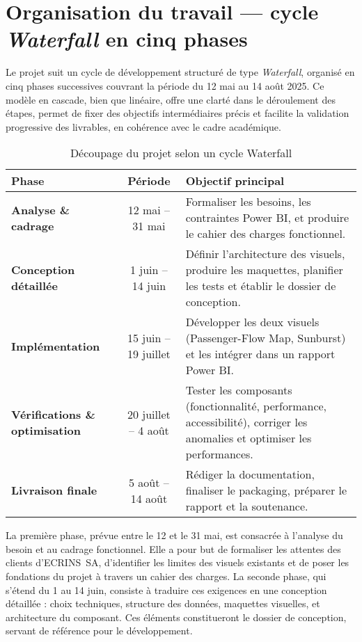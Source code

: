 \section{Organisation du travail — cycle \emph{Waterfall} en cinq phases}
\label{sec:organisation-waterfall}

Le projet suit un cycle de développement structuré de type \emph{Waterfall}, organisé en cinq phases successives couvrant la période du 12 mai au 14 août 2025. Ce modèle en cascade, bien que linéaire, offre une clarté dans le déroulement des étapes, permet de fixer des objectifs intermédiaires précis et facilite la validation progressive des livrables, en cohérence avec le cadre académique.

\begin{table}[H]
  \centering
  \caption{Découpage du projet selon un cycle Waterfall}
  \label{tab:planning-waterfall}
  \begin{tabularx}{\textwidth}{@{}>{\bfseries}l c X@{}}
    \toprule
    Phase & Période & Objectif principal \\
    \midrule
    Analyse \& cadrage & 12 mai – 31 mai & Formaliser les besoins, les contraintes Power BI, et produire le cahier des charges fonctionnel. \\
    Conception détaillée & 1 juin – 14 juin & Définir l’architecture des visuels, produire les maquettes, planifier les tests et établir le dossier de conception. \\
    Implémentation & 15 juin – 19 juillet & Développer les deux visuels (Passenger-Flow Map, Sunburst) et les intégrer dans un rapport Power BI. \\
    Vérifications \& optimisation & 20 juillet – 4 août & Tester les composants (fonctionnalité, performance, accessibilité), corriger les anomalies et optimiser les performances. \\
    Livraison finale & 5 août – 14 août & Rédiger la documentation, finaliser le packaging, préparer le rapport et la soutenance. \\
    \bottomrule
  \end{tabularx}
\end{table}

La première phase, prévue entre le 12 et le 31 mai, est consacrée à l’analyse du besoin et au cadrage fonctionnel. Elle a pour but de formaliser les attentes des clients d’ECRINS~SA, d’identifier les limites des visuels existants et de poser les fondations du projet à travers un cahier des charges. La seconde phase, qui s’étend du 1 au 14 juin, consiste à traduire ces exigences en une conception détaillée : choix techniques, structure des données, maquettes visuelles, et architecture du composant. Ces éléments constitueront le dossier de conception, servant de référence pour le développement.


